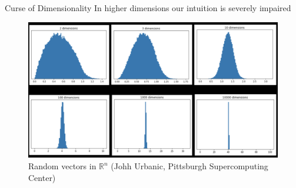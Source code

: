 \documentclass[11pt, aspectratio=43]{beamer}
\begin{document}
\begin{frame}{Curse of Dimensionality}
	In higher dimensions our intuition is severely impaired
		\begin{figure}[h]
		\centering
		\includegraphics[scale=0.45]{Figures/fig_curse_dim.png}
		\caption{Random vectors in $\mathbb{R}^n$ (Johh Urbanic, Pittsburgh Supercomputing Center)}
	\end{figure}
	
\end{frame}
\end{document}
